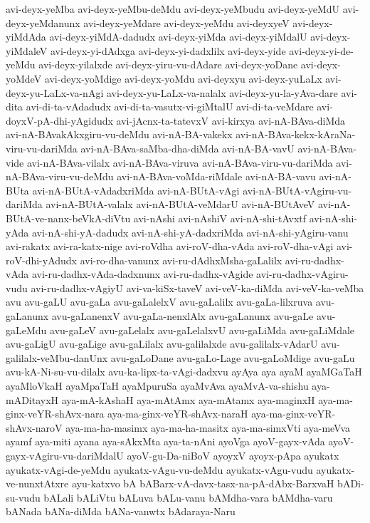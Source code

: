 {avi-deyx-yeMba
avi-deyx-yeMbu-deMdu
avi-deyx-yeMbudu
avi-deyx-yeMdU
avi-deyx-yeMdanunx
avi-deyx-yeMdare
avi-deyx-yeMdu
avi-deyxyeV
avi-deyx-yiMdAda
avi-deyx-yiMdA-dadudx
avi-deyx-yiMda
avi-deyx-yiMdalU
avi-deyx-yiMdaleV
avi-deyx-yi-dAdxga
avi-deyx-yi-dadxlilx
avi-deyx-yide
avi-deyx-yi-de-yeMdu
avi-deyx-yilalxde
avi-deyx-yiru-vu-dAdare
avi-deyx-yoDane
avi-deyx-yoMdeV
avi-deyx-yoMdige
avi-deyx-yoMdu
avi-deyxyu
avi-deyx-yuLaLx
avi-deyx-yu-LaLx-va-nAgi
avi-deyx-yu-LaLx-va-nalalx
avi-deyx-yu-la-yAva-dare
avi-dita
avi-di-ta-vAdadudx
avi-di-ta-vasutx-vi-giMtalU
avi-di-ta-veMdare
avi-doyxV-pA-dhi-yAgidudx
avi-jAcnx-ta-tatevxV
avi-kirxya
avi-nA-BAva-diMda
avi-nA-BAvakAkxgiru-vu-deMdu
avi-nA-BA-vakekx
avi-nA-BAva-kekx-kAraNa-viru-vu-dariMda
avi-nA-BAva-saMba-dha-diMda
avi-nA-BA-vavU
avi-nA-BAva-vide
avi-nA-BAva-vilalx
avi-nA-BAva-viruva
avi-nA-BAva-viru-vu-dariMda
avi-nA-BAva-viru-vu-deMdu
avi-nA-BAva-voMda-riMdale
avi-nA-BA-vavu
avi-nA-BUta
avi-nA-BUtA-vAdadxriMda
avi-nA-BUtA-vAgi
avi-nA-BUtA-vAgiru-vu-dariMda
avi-nA-BUtA-valalx
avi-nA-BUtA-veMdarU
avi-nA-BUtAveV
avi-nA-BUtA-ve-nanx-beVkA-diVtu
avi-nAshi
avi-nAshiV
avi-nA-shi-tAvxtf
avi-nA-shi-yAda
avi-nA-shi-yA-dadudx
avi-nA-shi-yA-dadxriMda
avi-nA-shi-yAgiru-vanu
avi-rakatx
avi-ra-katx-nige
avi-roVdha
avi-roV-dha-vAda
avi-roV-dha-vAgi
avi-roV-dhi-yAdudx
avi-ro-dha-vanunx
avi-ru-dAdhxMsha-gaLalilx
avi-ru-dadhx-vAda
avi-ru-dadhx-vAda-dadxnunx
avi-ru-dadhx-vAgide
avi-ru-dadhx-vAgiru-vudu
avi-ru-dadhx-vAgiyU
avi-va-kiSx-taveV
avi-veV-ka-diMda
avi-veV-ka-veMba
avu
avu-gaLU
avu-gaLa
avu-gaLalelxV
avu-gaLalilx
avu-gaLa-lilxruva
avu-gaLanunx
avu-gaLanenxV
avu-gaLa-nenxlAlx
avu-gaLanunx
avu-gaLe
avu-gaLeMdu
avu-gaLeV
avu-gaLelalx
avu-gaLelalxvU
avu-gaLiMda
avu-gaLiMdale
avu-gaLigU
avu-gaLige
avu-gaLilalx
avu-galilalxde
avu-galilalx-vAdarU
avu-galilalx-veMbu-danUnx
avu-gaLoDane
avu-gaLo-Lage
avu-gaLoMdige
avu-gaLu
avu-kA-Ni-su-vu-dilalx
avu-ka-lipx-ta-vAgi-dadxvu
ayAya
aya
ayaM
ayaMGaTaH
ayaMloVkaH
ayaMpaTaH
ayaMpuruSa
ayaMvAva
ayaMvA-va-shishu
aya-mADitayxH
aya-mA-kAshaH
aya-mAtAmx
aya-mAtamx
aya-maginxH
aya-ma-ginx-veYR-shAvx-nara
aya-ma-ginx-veYR-shAvx-naraH
aya-ma-ginx-veYR-shAvx-naroV
aya-ma-ha-masimx
aya-ma-ha-masitx
aya-ma-simxVti
aya-meVva
ayamf
aya-miti
ayana
aya-sAkxMta
aya-ta-nAni
ayoVga
ayoV-gayx-vAda
ayoV-gayx-vAgiru-vu-dariMdalU
ayoV-gu-Da-niBoV
ayoyxV
ayoyx-pApa
ayukatx
ayukatx-vAgi-de-yeMdu
ayukatx-vAgu-vu-deMdu
ayukatx-vAgu-vudu
ayukatx-ve-nunxtAtxre
ayu-katxvo
bA
bABarx-vA-davx-tasx-na-pA-dAbx-BarxvaH
bADi-su-vudu
bALali
bALiVtu
bALuva
bALu-vanu
bAMdha-vara
bAMdha-varu
bANada
bANa-diMda
bANa-vanwtx
bAdaraya-Naru
}
